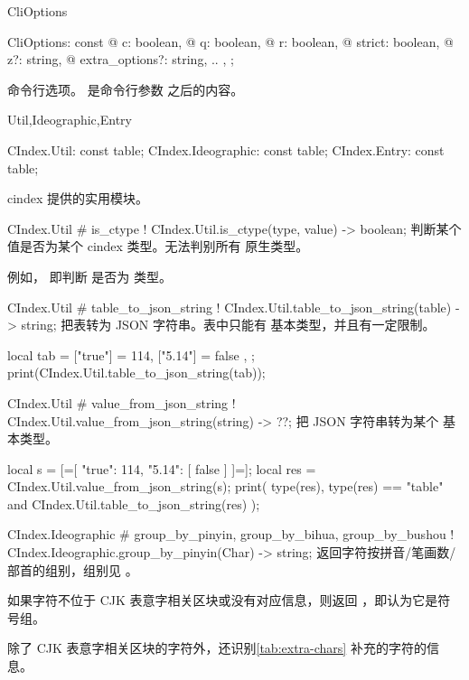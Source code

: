 \documentclass[class=article,doc={kv-usage}]{cusdoc}
\newcommand*\LUA{\texorpdfstring{\textcon{lua}}{lua}}
\begin{document}
\begin{luadoc}{CliOptions}
  \begin{luasyntax}
    CliOptions: const {
   @  c: boolean,
   @  q: boolean,
   @  r: boolean,
   @  strict: boolean,
   @  z?: string,
   @  extra_options?: { string, .. },
    };
  \end{luasyntax}
命令行选项。 是命令行参数 \textcon{--} 之后的内容。
\end{luadoc}

\begin{luadoc}[path=CIndex]{Util,Ideographic,Entry}
  \begin{luasyntax}
    CIndex.Util: const table;
    CIndex.Ideographic: const table;
    CIndex.Entry: const table;
  \end{luasyntax}
cindex 提供的实用模块。
\end{luadoc}

\begin{luadoc*}{CIndex.Util}
# is_ctype
! CIndex.Util.is_ctype(type, value) -> boolean;
判断某个值是否为某个 cindex 类型。无法判别所有 \LUA 原生类型。

例如， 即判断  是否为  类型。
\end{luadoc*}

\begin{luadoc*}{CIndex.Util}
# table_to_json_string
! CIndex.Util.table_to_json_string(table) -> string;
把表转为 JSON 字符串。表中只能有 \LUA 基本类型，并且有一定限制。
\end{luadoc*}

\begin{luarun}{}
local tab = {
    ["true"] = 114,
    ["5.14"] = { false },
};
print(CIndex.Util.table_to_json_string(tab));
\end{luarun}

\begin{luadoc*}{CIndex.Util}
# value_from_json_string
! CIndex.Util.value_from_json_string(string) -> ??;
把 JSON 字符串转为某个 \LUA 基本类型。
\end{luadoc*}

\begin{luarun}{}
local s = [=[
    {
      "true": 114,
      "5.14": [ false ]
    }
]=];
local res = CIndex.Util.value_from_json_string(s);
print(
    type(res),
    type(res) == "table" and CIndex.Util.table_to_json_string(res)
);
\end{luarun}

\begin{luadoc*}{CIndex.Ideographic}
# group_by_pinyin, group_by_bihua, group_by_bushou
! CIndex.Ideographic.group_by_pinyin(Char) -> string;
返回字符按拼音/笔画数/部首的组别，组别见 。

如果字符不位于 CJK 表意字相关区块或没有对应信息，则返回 ，即认为它是符号组。

除了 CJK 表意字相关区块的字符外，还识别\cref{tab:extra-chars} 补充的字符的信息。
\end{luadoc*}
\end{document}

